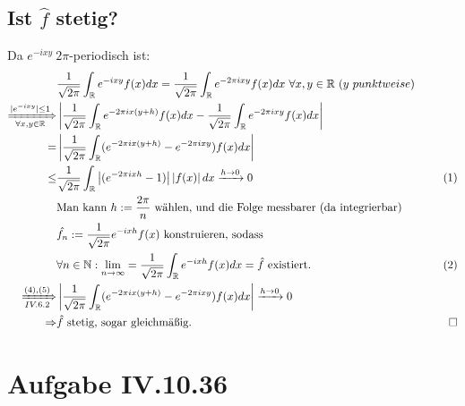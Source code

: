 \documentclass[12pt,a4paper]{article}
\newcommand{\myeq}[1]{\hfill{\refstepcounter{equation}(\theequation)\label{#1}}}
\begin{document}
\subsection*{Ist $\hat{f}$ stetig?}
Da $e^{-ixy} \  2\pi$-periodisch ist:
\begin{align*}
	&\frac{1}{\sqrt{2\pi}}\int_\mathbb{R}e^{-ixy}f(x)dx = \frac{1}{\sqrt{2\pi}}\int_\mathbb{R}e^{-2\pi ixy}f(x)dx \ \forall x,y \in \mathbb{R} \ (y \ punktweise)\\
	\xRightarrow[\forall x,y \in \mathbb{R}]{|e^{-ixy}| \leq 1}&\left\lvert\frac{1}{\sqrt{2\pi}}\int_\mathbb{R}e^{-2\pi ix(y+h)}f(x)dx - \frac{1}{\sqrt{2\pi}}\int_\mathbb{R}e^{-2\pi ixy}f(x)dx\right\lvert  \\
	=& \left\lvert \frac{1}{\sqrt{2\pi}}\int_\mathbb{R}(e^{-2\pi ix(y+h)}- e^{-2\pi ixy})f(x)dx\right\lvert \\
	\leq& \frac{1}{\sqrt{2\pi}}\int_\mathbb{R}\left\lvert (e^{-2\pi ixh}-1)\right\lvert \left\lvert f(x) \right\lvert dx \xrightarrow{h \rightarrow 0} 0&\myeq{}\\
	&\text{Man kann } h := \frac{2\pi}{n}\text{ wählen, und die Folge messbarer (da integrierbar) } \\
	&\hat{f_n}: = \frac{1}{\sqrt{2\pi}} e^{-ixh}f(x) \text{ konstruieren, sodass }\\ 
	& \forall n \in \mathbb{N}: \lim_{n\to\infty} = \frac{1}{\sqrt{2\pi}}\int_\mathbb{R} e^{-ixh}f(x)dx = \hat{f} \text{ existiert.}&\myeq{}\\ 
	\xRightarrow[IV.6.2]{(4),(5)}&\left\lvert \frac{1}{\sqrt{2\pi}}\int_\mathbb{R}(e^{-2\pi ix(y+h)}- e^{-2\pi ixy})f(x)dx\right\lvert \xrightarrow{h \rightarrow 0} 0\\
	\Rightarrow &\hat{f} \text{ stetig, sogar gleichmäßig.} &\qed
\end{align*}
\section*{Aufgabe IV.10.36}
\end{document}
